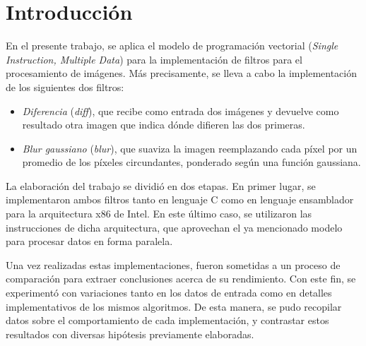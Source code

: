 \section{Introducción}

  En el presente trabajo, se aplica el modelo de programación vectorial  (\emph{Single Instruction, Multiple Data}) para la implementación de filtros para el procesamiento de imágenes. Más precisamente, se lleva a cabo la implementación de los siguientes dos filtros:
  \begin{itemize}
    \item \emph{Diferencia} (\emph{diff}), que recibe como entrada dos imágenes y devuelve como resultado otra imagen que indica dónde difieren las dos primeras.
    \item \emph{Blur gaussiano} (\emph{blur}), que suaviza la imagen reemplazando cada píxel por un promedio de los píxeles circundantes, ponderado según una función gaussiana.
  \end{itemize}

  La elaboración del trabajo se dividió en dos etapas. En primer lugar, se implementaron ambos filtros tanto en lenguaje C como en lenguaje ensamblador para la arquitectura x86 de Intel. En este último caso, se utilizaron las instrucciones  de dicha arquitectura, que aprovechan el ya mencionado modelo  para procesar datos en forma paralela.

  Una vez realizadas estas implementaciones, fueron sometidas a un proceso de comparación para extraer conclusiones acerca de su rendimiento. Con este fin, se experimentó con variaciones tanto en los datos de entrada como en detalles implementativos de los mismos algoritmos. De esta manera, se pudo recopilar datos sobre el comportamiento de cada implementación, y contrastar estos resultados con diversas hipótesis previamente elaboradas.
